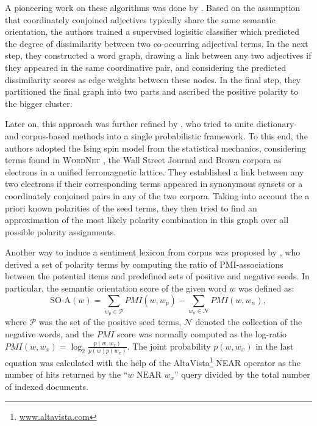 A pioneering work on these algorithms was done by
\citet{Hatzivassi:97}.  Based on the assumption that coordinately
conjoined adjectives typically share the same semantic orientation,
the authors trained a supervised logisitic classifier which predicted
the degree of dissimilarity between two co-occurring adjectival terms.
In the next step, they constructed a word graph, drawing a link
between any two adjectives if they appeared in the same coordinative
pair, and considering the predicted dissimilarity scores as edge
weights between these nodes.  In the final step, they partitioned the
final graph into two parts and ascribed the positive polarity to the
bigger cluster.%

Later on, this approach was further refined by \citet{Takamura:05},
who tried to unite dictionary- and corpus-based methods into a single
probabilistic framework.  To this end, the authors adopted the Ising
spin model from the statistical mechanics, considering terms found in
\textsc{WordNet} \cite{Miller:95}, the Wall Street Journal and Brown
corpora as electrons in a unified ferromagnetic lattice.  They
established a link between any two electrons if their corresponding
terms appeared in synonymous synsets or a coordinately conjoined pairs
in any of the two corpora.  Taking into account the a priori known
polarities of the seed terms, they then tried to find an approximation
of the most likely polarity combination in this graph over all
possible polarity assignments.%

Another way to induce a sentiment lexicon from corpus was proposed by
\citet{Turney:03}, who derived a set of polarity terms by computing
the ratio of PMI-associations between the potential items and
predefined sets of positive and negative seeds.  In particular, the
semantic orientation score of the given word $w$ was defined as:
\begin{equation*}
  \textrm{SO-A}(w) = \sum_{w_p\in\mathcal{P}}PMI(w, w_p) - \sum_{w_n\in\mathcal{N}}PMI(w, w_n),
\end{equation*}
where $\mathcal{P}$ was the set of the positive seed terms,
$\mathcal{N}$ denoted the collection of the negative words, and the
$PMI$ score was normally computed as the log-ratio $PMI(w, w_x) =
\log_2\frac{p(w, w_x)}{p(w)p(w_x)}$.  The joint probability $p(w,
w_x)$ in the last equation was calculated with the help of the
AltaVista\footnote{\url{www.altavista.com}} NEAR operator as the
number of hits returned by the ``$w\textrm{ NEAR }w_x$'' query divided
by the total number of indexed documents.

